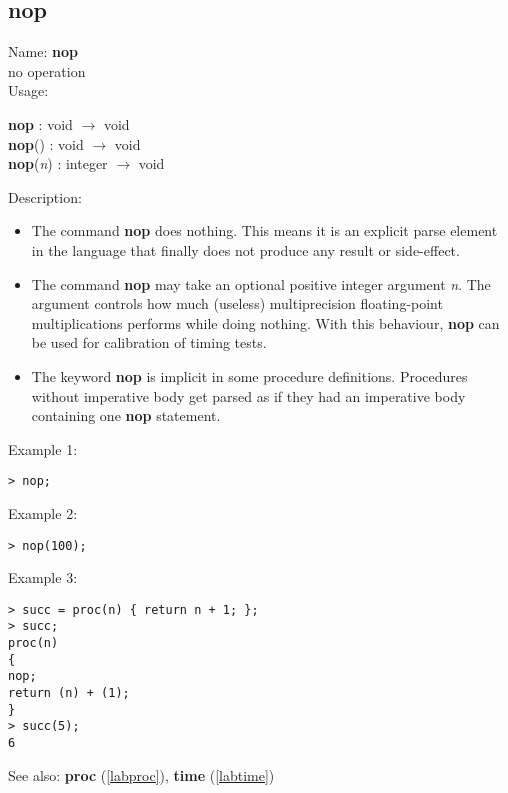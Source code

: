 \subsection{nop}
\label{labnop}
\noindent Name: \textbf{nop}\\
\phantom{aaa}no operation\\[0.2cm]
\noindent Usage: 
\begin{center}
\textbf{nop} : \textsf{void} $\rightarrow$ \textsf{void}\\
\textbf{nop}() : \textsf{void} $\rightarrow$ \textsf{void}\\
\textbf{nop}(\emph{n}) : \textsf{integer} $\rightarrow$ \textsf{void}\\
\end{center}
\noindent Description: \begin{itemize}

\item The command \textbf{nop} does nothing. This means it is an explicit parse
   element in the \sollya language that finally does not produce any
   result or side-effect.

\item The command \textbf{nop} may take an optional positive integer argument
   \emph{n}. The argument controls how much (useless) multiprecision
   floating-point multiplications \sollya performs while doing nothing.
   With this behaviour, \textbf{nop} can be used for calibration of timing
   tests.

\item The keyword \textbf{nop} is implicit in some procedure
   definitions. Procedures without imperative body get parsed as if they
   had an imperative body containing one \textbf{nop} statement.
\end{itemize}
\noindent Example 1: 
\begin{center}\begin{minipage}{15cm}\begin{Verbatim}[frame=single]
> nop;
\end{Verbatim}
\end{minipage}\end{center}
\noindent Example 2: 
\begin{center}\begin{minipage}{15cm}\begin{Verbatim}[frame=single]
> nop(100);
\end{Verbatim}
\end{minipage}\end{center}
\noindent Example 3: 
\begin{center}\begin{minipage}{15cm}\begin{Verbatim}[frame=single]
> succ = proc(n) { return n + 1; };
> succ;
proc(n)
{
nop;
return (n) + (1);
}
> succ(5);
6
\end{Verbatim}
\end{minipage}\end{center}
See also: \textbf{proc} (\ref{labproc}), \textbf{time} (\ref{labtime})
